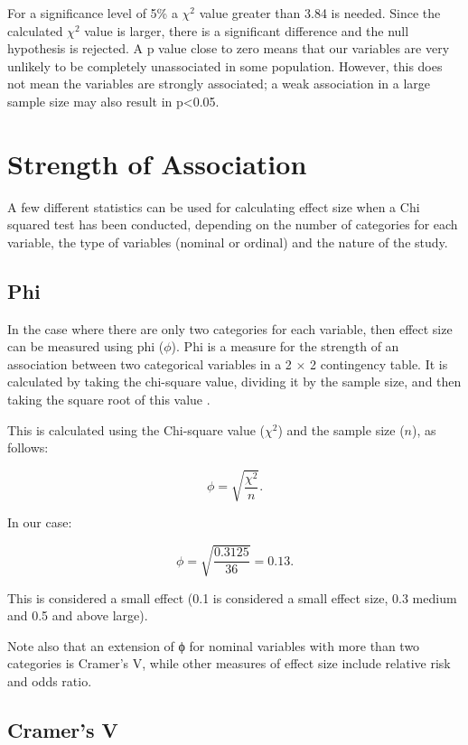 \documentclass[
]{book}
\begin{document}
For a significance level of 5\% a \(\chi^2\) value greater than 3.84 is needed. Since the calculated \(\chi^2\) value is larger, there is a significant difference and the null hypothesis is rejected. A p value close to zero means that our variables are very unlikely to be completely unassociated in some population. However, this does not mean the variables are strongly associated; a weak association in a large sample size may also result in p\textless0.05.

\hypertarget{strength-of-association}{%
\section{Strength of Association}\label{strength-of-association}}

A few different statistics can be used for calculating effect size when a Chi squared test has been conducted, depending on the number of categories for each variable, the type of variables (nominal or ordinal) and the nature of the study.

\hypertarget{phi}{%
\subsection{Phi}\label{phi}}

In the case where there are only two categories for each variable, then effect size can be measured using phi (\(\phi\)). Phi is a measure for the strength of an association between two categorical variables in a 2 \(\times\) 2 contingency table. It is calculated by taking the chi-square value, dividing it by the sample size, and then taking the square root of this value \citep{akoglu}.

This is calculated using the Chi-square value (\(\chi^2\)) and the sample size (\(n\)), as follows:

\[\phi=\sqrt{\frac{\chi^2}{n}}.\]

In our case:

\[\phi=\sqrt{\frac{0.3125}{36}}=0.13.\]

This is considered a small effect (0.1 is considered a small effect size, 0.3 medium and 0.5 and above large).

Note also that an extension of ϕ for nominal variables with more than two categories is Cramer's V, while other measures of effect size include relative risk and odds ratio.

\hypertarget{cramers-v}{%
\subsection{Cramer's V}\label{cramers-v}}
\end{document}

